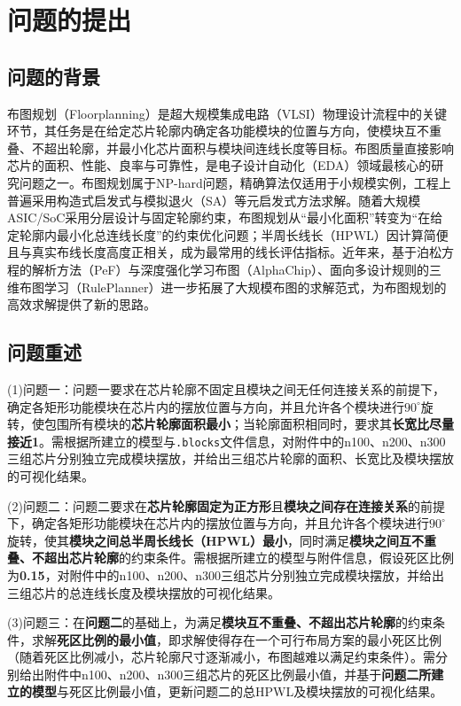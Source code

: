 \documentclass{JXUSTmodeling}
\begin{document}
\section{问题的提出}\label{sec:1}
\subsection{问题的背景}\label{sub:1.1}
布图规划（Floorplanning）是超大规模集成电路（VLSI）物理设计流程中的关键环节，其任务是在给定芯片轮廓内确定各功能模块的位置与方向，使模块互不重叠、不超出轮廓，并最小化芯片面积与模块间连线长度等目标。布图质量直接影响芯片的面积、性能、良率与可靠性，是电子设计自动化（EDA）领域最核心的研究问题之一。布图规划属于NP-hard问题，精确算法仅适用于小规模实例，工程上普遍采用构造式启发式与模拟退火（SA）等元启发式方法求解\cite{huang2021}。随着大规模ASIC/SoC采用分层设计与固定轮廓约束，布图规划从“最小化面积”转变为“在给定轮廓内最小化总连线长度”的约束优化问题\cite{adya2003}；半周长线长（HPWL）因计算简便且与真实布线长度高度正相关，成为最常用的线长评估指标。近年来，基于泊松方程的解析方法（PeF）\cite{li2023pef}与深度强化学习布图（AlphaChip）\cite{mirhoseini2021}、面向多设计规则的三维布图学习（RulePlanner）\cite{zhong2026ruleplanner}进一步拓展了大规模布图的求解范式，为布图规划的高效求解提供了新的思路。

\subsection{问题重述}\label{sub:1.3}

(1)问题一：问题一要求在芯片轮廓不固定且模块之间无任何连接关系的前提下，确定各矩形功能模块在芯片内的摆放位置与方向，并且允许各个模块进行$90^\circ$旋转，使包围所有模块的\textbf{芯片轮廓面积最小}；当轮廓面积相同时，要求其\textbf{长宽比尽量接近1}。需根据所建立的模型与\texttt{.blocks}文件信息，对附件中的n100、n200、n300三组芯片分别独立完成模块摆放，并给出三组芯片轮廓的面积、长宽比及模块摆放的可视化结果。

(2)问题二：问题二要求在\textbf{芯片轮廓固定为正方形}且\textbf{模块之间存在连接关系}的前提下，确定各矩形功能模块在芯片内的摆放位置与方向，并且允许各个模块进行$90^\circ$旋转，使其\textbf{模块之间总半周长线长（HPWL）最小}，同时满足\textbf{模块之间互不重叠、不超出芯片轮廓}的约束条件。需根据所建立的模型与附件信息，假设死区比例为\textbf{0.15}，对附件中的n100、n200、n300三组芯片分别独立完成模块摆放，并给出三组芯片的总连线长度及模块摆放的可视化结果。

(3)问题三：在\textbf{问题二}的基础上，为满足\textbf{模块互不重叠、不超出芯片轮廓}的约束条件，求解\textbf{死区比例的最小值}，即求解使得存在一个可行布局方案的最小死区比例（随着死区比例减小，芯片轮廓尺寸逐渐减小，布图越难以满足约束条件）。需分别给出附件中n100、n200、n300三组芯片的死区比例最小值，并基于\textbf{问题二所建立的模型}与死区比例最小值，更新问题二的总HPWL及模块摆放的可视化结果。
\end{document}
